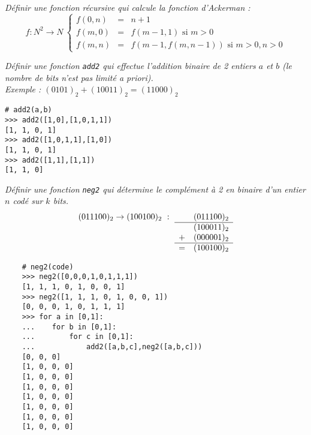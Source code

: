 \begin{td}\label{td:ackerman}
\em
Définir une fonction récursive qui calcule la fonction d'Ackerman : 
$$
{f : N^2 \rightarrow N}\ 
\left\{\begin{array}{lll}
f{(0,n)} & = & n+1\\
f{(m,0)} & = & f{(m-1,1)}\mbox{\ si\ } m > 0\\
f{(m,n)} & = & f{(m-1,f{(m,n-1)})}\mbox{\ si\ } m > 0, n > 0
\end{array}\right.
$$
\end{td}

\begin{td}[Addition binaire]\label{td:addition2}
\em
Définir une fonction {\tt add2} qui effectue l'addition binaire de 2 
entiers $a$ et $b$ (le nombre de bits n'est pas limité {\em a priori}).\\
Exemple : $(0101)_2 + (10011)_2 = (11000)_2$

\begin{py}{7cm}
\begin{verbatim}
# add2(a,b)
>>> add2([1,0],[1,0,1,1])
[1, 1, 0, 1]
>>> add2([1,0,1,1],[1,0])
[1, 1, 0, 1]
>>> add2([1,1],[1,1])
[1, 1, 0]
\end{verbatim}
\end{py}
\end{td}

\begin{td}[Complément à 2]\label{td:complement2}
\em
Définir une fonction {\tt neg2} qui détermine le complément à 2 en binaire 
d'un entier $n$ codé sur $k$ bits.
	$$(011100)_2 \rightarrow (100100)_2\ :\ \begin{array}[t]{lrr} 
	  & (011100)_2\\
	\hline
	  & (100011)_2\\
	+ & (000001)_2\\
	\hline
	= & (100100)_2
	\end{array}$$

	\begin{py}{7cm}
	\begin{verbatim}
	# neg2(code)
	>>> neg2([0,0,0,1,0,1,1,1])
	[1, 1, 1, 0, 1, 0, 0, 1]
	>>> neg2([1, 1, 1, 0, 1, 0, 0, 1])
	[0, 0, 0, 1, 0, 1, 1, 1]
	>>> for a in [0,1]:
	...    for b in [0,1]:
	...        for c in [0,1]:
	...            add2([a,b,c],neg2([a,b,c]))
	[0, 0, 0]
	[1, 0, 0, 0]
	[1, 0, 0, 0]
	[1, 0, 0, 0]
	[1, 0, 0, 0]
	[1, 0, 0, 0]
	[1, 0, 0, 0]
	[1, 0, 0, 0]
	\end{verbatim}
	\end{py}
\end{td}

